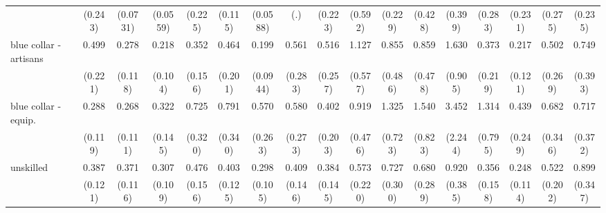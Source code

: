 {\begin{tabular}{l*{16}{c}}
                    &     (0.243)         &    (0.0731)         &    (0.0559)         &     (0.225)         &     (0.115)         &    (0.0588)         &         (.)         &     (0.223)         &     (0.592)         &     (0.229)         &     (0.428)         &     (0.399)         &     (0.283)         &     (0.231)         &     (0.275)         &     (0.235)         \\
[1em]
blue collar - artisans&       0.499         &       0.278\sym{**} &       0.218\sym{**} &       0.352\sym{*}  &       0.464         &       0.199\sym{***}&       0.561         &       0.516         &       1.127         &       0.855         &       0.859         &       1.630         &       0.373         &       0.217\sym{**} &       0.502         &       0.749         \\
                    &     (0.221)         &     (0.118)         &     (0.104)         &     (0.156)         &     (0.201)         &    (0.0944)         &     (0.283)         &     (0.257)         &     (0.577)         &     (0.486)         &     (0.478)         &     (0.905)         &     (0.219)         &     (0.121)         &     (0.269)         &     (0.393)         \\
[1em]
blue collar - equip.&       0.288\sym{**} &       0.268\sym{**} &       0.322\sym{*}  &       0.725         &       0.791         &       0.570         &       0.580         &       0.402         &       0.919         &       1.325         &       1.540         &       3.452         &       1.314         &       0.439         &       0.682         &       0.717         \\
                    &     (0.119)         &     (0.111)         &     (0.145)         &     (0.320)         &     (0.340)         &     (0.263)         &     (0.273)         &     (0.203)         &     (0.476)         &     (0.723)         &     (0.823)         &     (2.244)         &     (0.795)         &     (0.249)         &     (0.346)         &     (0.372)         \\
[1em]
unskilled           &       0.387\sym{**} &       0.371\sym{**} &       0.307\sym{***}&       0.476\sym{*}  &       0.403\sym{**} &       0.298\sym{***}&       0.409\sym{*}  &       0.384\sym{*}  &       0.573         &       0.727         &       0.680         &       0.920         &       0.356\sym{*}  &       0.248\sym{**} &       0.522         &       0.899         \\
                    &     (0.121)         &     (0.116)         &     (0.109)         &     (0.156)         &     (0.125)         &     (0.105)         &     (0.146)         &     (0.145)         &     (0.220)         &     (0.300)         &     (0.289)         &     (0.385)         &     (0.158)         &     (0.114)         &     (0.202)         &     (0.347)         \\

\end{tabular}}
